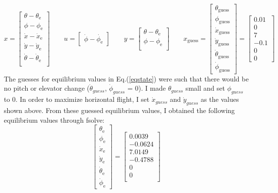 \documentclass[12pt]{article}
\begin{document}
\begin{equation}
\label{eqstate}
x=
\begin{bmatrix}
\theta - \theta_{\text{e}}\\
\phi - \phi_{\text{e}}\\
\dot{x} - \dot{x}_{\text{e}}\\
\dot{y} - \dot{y}_{\text{e}}\\
\dot{\theta} - \dot{\theta}_{\text{e}}\\
\end{bmatrix} \qquad
u =
\begin{bmatrix}
\dot{\phi}-\dot{\phi_{\text{e}}}
\end{bmatrix} \qquad
y =
\begin{bmatrix}
\theta - \theta_{\text{e}}\\
\phi - \phi_{\text{e}}\\
\end{bmatrix} \qquad
x_{\text{guess}} =
\begin{bmatrix} 
\theta_{\text{guess}}\\
\phi_{\text{guess}}\\
\dot{x}_{\text{guess}}\\
\dot{y}_{\text{guess}}\\
\dot{\theta}_{\text{guess}}\\
\dot{\phi}_{\text{guess}}
\end{bmatrix}=
\begin{bmatrix} 
0.01\\0\\7\\-0.1\\0\\0
\end{bmatrix}
\end{equation}
The guesses for equilibrium values in Eq.(\eqref{eqstate}) were such that there would be no pitch or elevator change ($\dot{\theta}_{guess}$, $\dot{\phi}_{guess}$ = 0). I made $\theta_{guess}$ small and set $\phi_{guess}$ to 0. In order to maximize horizontal flight, I set $\dot{x}_{guess}$ and $\dot{y}_{guess}$ as the values shown above. From these guessed equilibrium values, I obtained the following equilibrium values through fsolve:
\begin{equation}
\label{eqeqv}
\begin{bmatrix} 
\theta_{\text{e}}\\
\phi_{\text{e}}\\
\dot{x}_{\text{e}}\\
\dot{y}_{\text{e}}\\
\dot{\theta}_{\text{e}}\\
\dot{\phi}_{\text{e}}
\end{bmatrix}=
\begin{bmatrix} 
0.0039\\-0.0624\\7.0149\\-0.4788\\0\\0\\
\end{bmatrix}
\end{equation}
\end{document}
